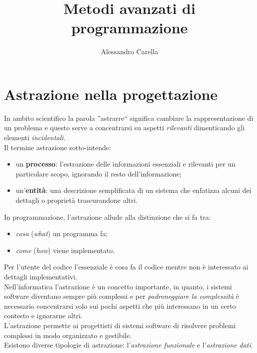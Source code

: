 \documentclass[12pt]{report}
\date{}
\author{Alessandro Carella}
\title{Metodi avanzati di programmazione}
\begin{document}
	{
		\let\cleardoublepage\clearpage
		\maketitle
		\tableofcontents
	}
	\chapter{Astrazione nella progettazione}
	In ambito scientifico la parola ''astrarre`` significa cambiare la rappresentazione di un problema e questo serve a concentrarsi su aspetti \textit{rilevanti} dimenticando gli elementi \textit{incidentali}. \\
	Il termine astrazione sotto-intende:
	\begin{itemize}
		\item un \textbf{processo}: l'estrazione delle informazioni essenziali e rilevanti per un particolare scopo, ignorando il resto dell'informazione;
		\item un'\textbf{entità}: una descrizione semplificata di un sistema che enfatizza alcuni dei dettagli o proprietà trascurandone altri.
	\end{itemize}
	In programmazione, l'astrazione allude alla distinzione che si fa tra:
	\begin{itemize}
		\item \textit{cosa} (\textit{what}) un programma fa;
		\item \textit{come} (\textit{how}) viene implementato.
	\end{itemize}
	Per l'utente del codice l'essenziale è cosa fa il codice mentre non è interessato ai dettagli implementativi. \\
	Nell'informatica l'astrazione è un concetto importante, in quanto, i sistemi software diventano sempre più complessi e per \textit{padroneggiare la complessità} è necessario concentrarsi solo sui pochi aspetti che più interessano in un certo contesto e ignorarne altri. \\
	L'astrazione permette ai progettisti di sistemi software di risolvere problemi complessi in modo organizzato e gestibile. \\
	Esistono diverse tipologie di astrazione: l'\textit{astrazione funzionale} e l'\textit{astrazione dati}.
\end{document}
